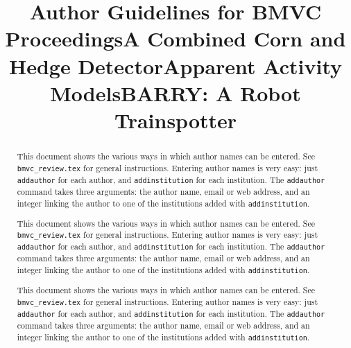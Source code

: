\documentclass{bmvc2k}
\begin{document}
\def\cmd#1{{\tt #1}}
\def\makeabstract{
\begin{abstract}
This document shows the various ways in which author names can be entered.
See {\tt bmvc\_review.tex} for general instructions.  Entering author names
is very easy: just \cmd{addauthor} for each author, and
\cmd{addinstitution} for each institution. The \cmd{addauthor} command
takes three arguments: the author name, email or web address, and an
integer linking the author to one of the institutions added with
\cmd{addinstitution}. 
\end{abstract}
}

\title{Author Guidelines for BMVC Proceedings}


\maketitle
\makeabstract

\bmvaResetAuthors
\title{A Combined Corn and Hedge Detector}

\maketitle
\makeabstract

\bmvaResetAuthors
\title{Apparent Activity Models}

\maketitle
\makeabstract

\bmvaResetAuthors
\title{B{\large\bfseries ARRY}: A Robot Trainspotter}
\end{document}
